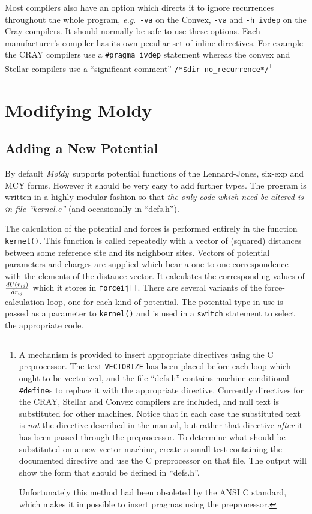 \documentclass[twoside]{report}
\newcommand{\moldy}{{\em Moldy}}
\newcommand{\eg}{{\em e.g}.\ }
\begin{document}
Most compilers also have an option which directs it to ignore
recurrences throughout the whole program, \eg \texttt{-va} on the
Convex, \texttt{-va} and \texttt{-h ivdep} on the Cray compilers.  It
should normally be safe to use these options. Each manufacturer's
compiler has its own peculiar set of inline directives.  For example
the CRAY compilers use a \texttt{\#pragma}~\texttt{ivdep} statement
whereas the convex and Stellar compilers use a ``significant comment''
\texttt{/*\$dir no\_recurrence*/}\footnote{A mechanism is
  provided to insert appropriate directives using the C preprocessor.
  The text \texttt{VECTORIZE} has been placed before each loop which
  ought to be vectorized, and the file ``defs.h'' contains
  machine-conditional \texttt{\#define}s to replace it with the
  appropriate directive.  Currently directives for the CRAY, Stellar
  and Convex compilers are included, and null text is substituted for
  other machines.  Notice that in each case the substituted text is
  {\em not\/} the directive described in the manual, but rather that
  directive {\em after\/} it has been passed through the preprocessor.
  To determine what should be substituted on a new vector machine,
  create a small test containing the documented directive and use the
  C preprocessor on that file. The output will show the form that
  should be defined in ``defs.h''.
  
  Unfortunately this method had been obsoleted by the ANSI C standard,
  which makes it impossible to insert pragmas using the
  preprocessor. } 

\section{Modifying Moldy}%
\subsection{Adding a New Potential}
\label{sec:newpot}
By default \moldy\  supports potential functions of the Lennard-Jones,
six-exp and MCY forms.  However it should be very easy to add further
types. The program is written in a highly modular fashion so that {\em
the only code which need be altered is in file ``kernel.c''\/} (and
occasionally in ``defs.h''). 

The calculation of the potential and forces is performed entirely in
the function \texttt{kernel()}.  This function is called repeatedly with
a vector of (squared) distances between some reference site and its
neighbour sites.  Vectors of potential parameters and charges are
supplied which bear a one to one correspondence with the elements of
the distance vector.  It calculates the corresponding values of
${dU(r_{ij})} \over {dr_{ij}}$ which it stores in \texttt{forceij[]}.
There are several variants of the force-calculation loop, one for each
kind of potential.  The potential type in use is passed as a parameter
to \texttt{kernel()} and is used in a \texttt{switch} statement to select
the appropriate code. 
\end{document}
